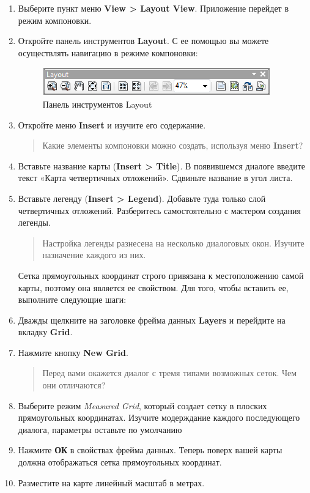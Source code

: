 \documentclass[12pt,]{book}
\begin{document}
\begin{enumerate}
\def\labelenumi{\arabic{enumi}.}
\item
  Выберите пункт меню \textbf{View \textgreater{} Layout View}. Приложение перейдет в режим компоновки.
\item
  Откройте панель инструментов \textbf{Layout}. С ее помощью вы можете осуществлять навигацию в режиме компоновки:

  \begin{figure}
  \centering
  \includegraphics{images/Ex01/image20.png}
  \caption{Панель инструментов Layout}
  \end{figure}
\item
  Откройте меню \textbf{Insert} и изучите его содержание.

  \begin{quote}
  Какие элементы компоновки можно создать, используя меню \textbf{Insert}?
  \end{quote}
\item
  Вставьте название карты (\textbf{Insert \textgreater{} Title}). В появившемся диалоге введите текст «Карта четвертичных отложений». Сдвиньте название в угол листа.
\item
  Вставьте легенду (\textbf{Insert \textgreater{} Legend}). Добавьте туда только слой четвертичных отложений. Разберитесь самостоятельно с мастером создания легенды.

  \begin{quote}
  Настройка легенды разнесена на несколько диалоговых окон. Изучите назначение каждого из них.
  \end{quote}

  Сетка прямоугольных координат строго привязана к местоположению самой карты, поэтому она является ее свойством. Для того, чтобы вставить ее, выполните следующие шаги:
\item
  Дважды щелкните на заголовке фрейма данных \textbf{Layers} и перейдите на вкладку \textbf{Grid}.
\item
  Нажмите кнопку \textbf{New Grid}.

  \begin{quote}
  Перед вами окажется диалог с тремя типами возможных сеток. Чем они отличаются?
  \end{quote}
\item
  Выберите режим \emph{Measured Grid}, который создает сетку в плоских прямоугольных координатах. Изучите модерждание каждого последующего диалога, параметры оставьте по умолчанию
\item
  Нажмите \textbf{ОК} в свойствах фрейма данных. Теперь поверх вашей карты должна отображаться сетка прямоугольных координат.
\item
  Разместите на карте линейный масштаб в метрах.
\end{enumerate}
\end{document}
